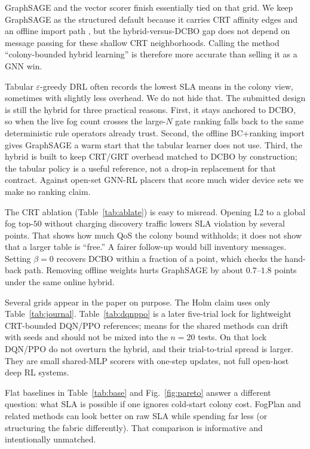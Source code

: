 \documentclass[11pt,a4paper]{article}
\begin{document}
GraphSAGE and the vector scorer finish essentially tied on that grid. We keep
GraphSAGE as the structured default because it carries CRT affinity edges and
an offline import path
\cite{hamilton_graphsage2017,xu_gin_iclr2019,ross_aistats2011_dagger}, but the
hybrid-versus-DCBO gap does not depend on message passing for these shallow
CRT neighborhoods. Calling the method ``colony-bounded hybrid learning'' is
therefore more accurate than selling it as a GNN win.

Tabular $\varepsilon$-greedy DRL often records the lowest SLA means in the
colony view, sometimes with slightly less overhead. We do not hide that. The
submitted design is still the hybrid for three practical reasons. First, it
stays anchored to DCBO, so when the live fog count crosses the large-$N$ gate
ranking falls back to the same deterministic rule operators already trust.
Second, the offline BC+ranking import gives GraphSAGE a warm start that the
tabular learner does not use. Third, the hybrid is built to keep CRT/GRT
overhead matched to DCBO by construction; the tabular policy is a useful
reference, not a drop-in replacement for that contract. Against open-set
GNN-RL placers that score much wider device sets
\cite{lera_jsup2024_gnn,chen_tmc2024_dgddpg} we make no ranking claim.

The CRT ablation (Table~\ref{tab:ablate}) is easy to misread. Opening L2 to a
global fog top-$50$ without charging discovery traffic lowers SLA violation by
several points. That shows how much QoS the colony bound withholds; it does not
show that a larger table is ``free.'' A fairer follow-up would bill inventory
messages. Setting $\beta{=}0$ recovers DCBO within a fraction of a point, which
checks the hand-back path. Removing offline weights hurts GraphSAGE by about
$0.7$--$1.8$ points under the same online hybrid.

Several grids appear in the paper on purpose. The Holm claim uses only
Table~\ref{tab:journal}. Table~\ref{tab:dqnppo} is a later five-trial lock for
lightweight CRT-bounded DQN/PPO references; means for the shared methods can
drift with seeds and should not be mixed into the $n{=}20$ tests. On that lock
DQN/PPO do not overturn the hybrid, and their trial-to-trial spread is larger.
They are small shared-MLP scorers with one-step updates, not full open-host
deep RL systems.

Flat baselines in Table~\ref{tab:base} and Fig.~\ref{fig:pareto} answer a
different question: what SLA is possible if one ignores cold-start colony cost.
FogPlan and related methods can look better on raw SLA while spending far less
(or structuring the fabric differently). That comparison is informative and
intentionally unmatched.
\end{document}

